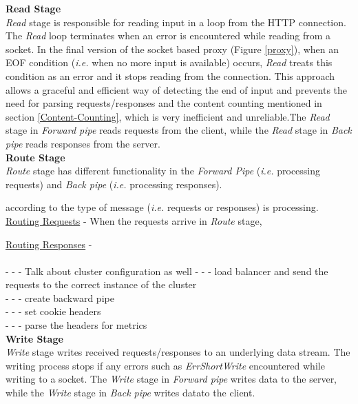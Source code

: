 \documentclass[a4paper,11pt,twoside]{article}
\begin{document}
\noindent
\textbf{Read Stage} \\
\textit{Read} stage is responsible for reading input in a loop from the HTTP connection. The \textit{Read} loop terminates when an error is encountered while reading from a socket. In the final version of the socket based proxy (Figure \ref{proxy}), when an EOF condition (\textit{i.e.}  when no more input is available) occurs, \textit{Read} treats this condition as an error and it stops reading from the connection. This approach allows a graceful and efficient way of detecting the end of input and prevents the need for parsing requests/responses and the content counting mentioned in section \ref{Content-Counting}, which is very inefficient and unreliable.The \textit{Read} stage in \textit{Forward pipe} reads requests from the client, while the \textit{Read} stage in \textit{Back pipe} reads responses from the server.   \\

\noindent
\textbf{Route Stage} \\
\textit{Route} stage has different functionality in the \textit{Forward Pipe} (\textit{i.e.} processing requests) and \textit{Back pipe} (\textit{i.e.} processing responses).    


according to the type of message (\textit{i.e.} requests or responses) is processing.\\

\underline{Routing Requests} - When the requests arrive in \textit{Route} stage,   

\underline{Routing Responses} - \\\\




			-  -  - Talk about cluster configuration as well  
  			-  -  - load balancer and send the requests to the correct instance of the cluster\\
  			-  -  - create backward pipe\\
  			-  -  - set cookie headers\\
  			-  -  - parse the headers for metrics\\
  
\noindent
\textbf{Write Stage} \\
\textit{Write} stage writes received requests/responses to an underlying data stream. The writing process stops if any errors such as \textit{ErrShortWrite} encountered while writing to a socket. The \textit{Write} stage in \textit{Forward pipe} writes data to the server, while the \textit{Write} stage in \textit{Back pipe} writes datato the client.   \\
\end{document}
